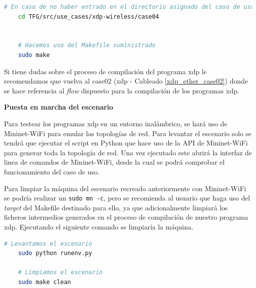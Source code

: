\begin{lstlisting}[language= bash, style=Consola, caption={Compilación programa XDP - Case04},label=code:case04_xdp_wifi_compilacion]
    # En caso de no haber entrado en el directorio asignado del caso de uso
    cd TFG/src/use_cases/xdp-wireless/case04
    
    
    # Hacemos uso del Makefile suministrado 
    sudo make
\end{lstlisting}
\vspace{0.5cm}

Si tiene dudas sobre el proceso de compilación del programa \gls{xdp} le recomendamos que vuelva al case02 (\gls{xdp} - Cableado \ref{xdp_ether_case02}) donde se hace referencia al \textit{flow} dispuesto para la compilación de los programas \gls{xdp}.\\
\par



\vspace{0.5cm}
\textbf{Puesta en marcha del escenario}\\
\par

Para testear los programas \gls{xdp} en un entorno inalámbrico, se hará uso de Mininet-WiFi para emular las topologías de red. Para levantar el escenario solo se tendrá que ejecutar el script en Python que hace uso de la API de Mininet-WiFi para generar toda la topología de red. Una vez ejecutado este abrirá la interfaz de linea de comandos de Mininet-WiFi, desde la cual se podrá comprobar el funcionamiento del caso de uso. \\
\par

Para limpiar la máquina del escenario recreado anteriormente con Mininet-WiFi se podría realizar un \texttt{sudo mn -c}, pero se recomienda al usuario que haga uso del \textit{target} del Makefile destinado para ello, ya que adicionalmente limpiará los ficheros intermedios generados en el proceso de compilación de nuestro programa \gls{xdp}. Ejecutando el siguiente comando se limpiaría la máquina.

\begin{lstlisting}[language= bash, style=Consola, caption={Compilación programa XDP - Case04},label=code:case04_xdp_wifi_run]
    # Levantamos el escenario
    sudo python runenv.py
      
    # Limpiamos el escenario
    sudo make clean
\end{lstlisting}
\vspace{0.5cm}

